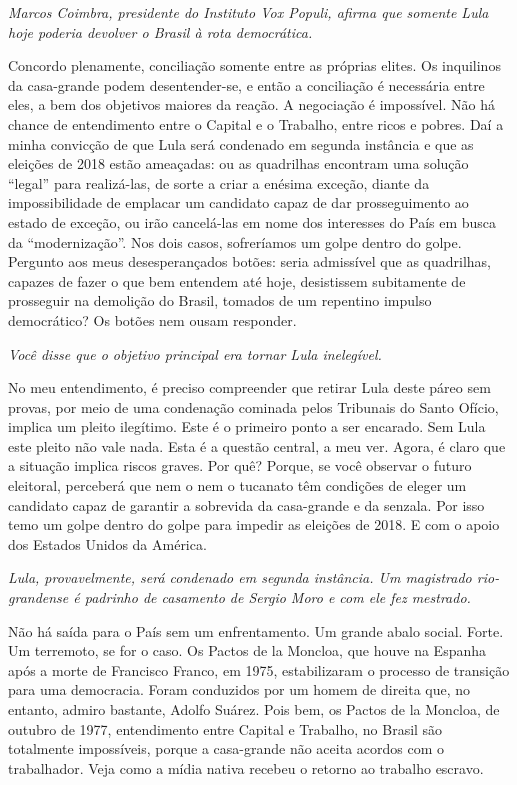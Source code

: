 \itshape
 Marcos Coimbra, presidente do Instituto Vox Populi,
afirma que somente Lula hoje poderia devolver o Brasil à rota
democrática.

\normalfont
Concordo plenamente, conciliação somente entre as
próprias elites. Os inquilinos da casa-grande podem desentender-se, e
então a conciliação é necessária entre eles, a bem dos objetivos maiores
da reação. A negociação é impossível. Não há chance de entendimento
entre o Capital e o Trabalho, entre ricos e pobres. Daí a minha
convicção de que Lula será condenado em segunda instância e que as
eleições de 2018 estão ameaçadas: ou as quadrilhas encontram uma solução
``legal'' para realizá-las, de sorte a criar a enésima exceção, diante
da impossibilidade de emplacar um candidato capaz de dar prosseguimento
ao estado de exceção, ou irão cancelá-las em nome dos interesses do País
em busca da ``modernização''. Nos dois casos, sofreríamos um golpe
dentro do golpe. Pergunto aos meus desesperançados botões: seria
admissível que as quadrilhas, capazes de fazer o que bem entendem até
hoje, desistissem subitamente de prosseguir na demolição do Brasil,
tomados de um repentino impulso democrático? Os botões nem ousam
responder.

\itshape
 Você disse que o objetivo principal era tornar Lula
inelegível.

\normalfont
No meu entendimento, é preciso compreender que retirar
Lula deste páreo sem provas, por meio de uma condenação cominada pelos
Tribunais do Santo Ofício, implica um pleito ilegítimo. Este é o
primeiro ponto a ser encarado. Sem Lula este pleito não vale nada. Esta
é a questão central, a meu ver. Agora, é claro que a situação implica
riscos graves. Por quê? Porque, se você observar o futuro eleitoral,
perceberá que nem o  nem o tucanato têm condições de eleger um
candidato capaz de garantir a sobrevida da casa-grande e da senzala. Por
isso temo um golpe dentro do golpe para impedir as eleições de 2018. E
com o apoio dos Estados Unidos da América.

\itshape
 Lula, provavelmente, será condenado em segunda
instância. Um magistrado rio-grandense é padrinho de casamento de Sergio
Moro e com ele fez mestrado.

\normalfont
Não há saída para o País sem um enfrentamento. Um grande
abalo social. Forte. Um terremoto, se for o caso. Os Pactos de la
Moncloa, que houve na Espanha após a morte de Francisco Franco, em 1975,
estabilizaram o processo de transição para uma democracia. Foram
conduzidos por um homem de direita que, no entanto, admiro bastante,
Adolfo Suárez. Pois bem, os Pactos de la Moncloa, de outubro de 1977,
entendimento entre Capital e Trabalho, no Brasil são totalmente
impossíveis, porque a casa-grande não aceita acordos com o trabalhador.
Veja como a mídia nativa recebeu o retorno ao trabalho escravo.

